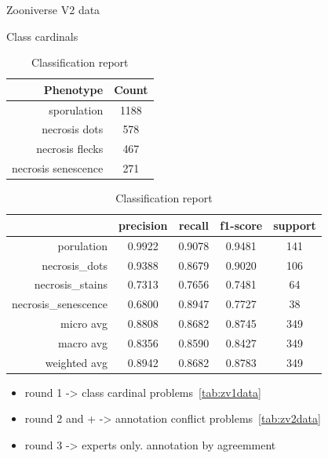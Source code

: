 \documentclass[english]{article}
\begin{document}
\begin{table}[H]
	\caption{Zooniverse V2 data}\label{tab:zv2data}
	\begin{minipage}{0.4\linewidth}
		\centering
		\caption{Class cardinals}\label{tab:zoonv2classcardinals}
		\begin{tabular}{rc}
			\toprule
			Phenotype           & Count \\
			\midrule
			sporulation         & 1188  \\
			necrosis dots       & 578   \\
			necrosis flecks     & 467   \\
			necrosis senescence & 271   \\
			\bottomrule
		\end{tabular}
	\end{minipage}%
	\begin{minipage}{0.4\linewidth}
		\centering
		\caption{Classification report}\label{tab:zv2mcr}
		\begin{tabular}{rcccc}
			\toprule
			{}                   & precision & recall & f1-score & support \\
			\midrule
			porulation           & 0.9922    & 0.9078 & 0.9481   & 141     \\
			necrosis\_dots       & 0.9388    & 0.8679 & 0.9020   & 106     \\
			necrosis\_stains     & 0.7313    & 0.7656 & 0.7481   & 64      \\
			necrosis\_senescence & 0.6800    & 0.8947 & 0.7727   & 38      \\
			micro avg            & 0.8808    & 0.8682 & 0.8745   & 349     \\
			macro avg            & 0.8356    & 0.8590 & 0.8427   & 349     \\
			weighted avg         & 0.8942    & 0.8682 & 0.8783   & 349     \\
			\bottomrule
		\end{tabular}
	\end{minipage}
\end{table}

\begin{itemize}
	\item round 1 -> class cardinal problems~\ref*{tab:zv1data}
	\item round 2 and + -> annotation conflict problems~\ref*{tab:zv2data}
	\item round 3 -> experts only. annotation by agreemment
\end{itemize}
\end{document}
